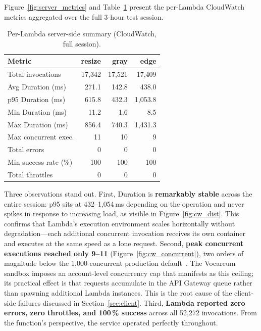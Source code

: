 \documentclass[10pt,twocolumn]{article}
\begin{document}
Figure~\ref{fig:server_metrics} and Table~\ref{tab:cloudwatch} present the
per-Lambda CloudWatch metrics aggregated over the full 3-hour test session.

\begin{table}[t]
\centering
\caption{Per-Lambda server-side summary (CloudWatch, full session).}
\label{tab:cloudwatch}
\small
\setlength{\tabcolsep}{3.5pt}
\begin{tabular}{lrrr}
\toprule
\textbf{Metric} & \textbf{resize} & \textbf{gray} & \textbf{edge} \\
\midrule
Total invocations       & 17{,}342 & 17{,}521 & 17{,}409 \\
Avg Duration (ms)       & 271.1    & 142.8    & 438.0    \\
p95 Duration (ms)       & 615.8    & 432.3    & 1{,}053.8 \\
Min Duration (ms)       & 11.2     & 1.6      & 8.5      \\
Max Duration (ms)       & 856.4    & 740.3    & 1{,}431.3 \\
Max concurrent exec.    & 11       & 10       & 9        \\
Total errors            & 0        & 0        & 0        \\
Min success rate (\%)   & 100      & 100      & 100      \\
Total throttles         & 0        & 0        & 0        \\
\bottomrule
\end{tabular}
\end{table}

Three observations stand out. First, Duration is \textbf{remarkably stable}
across the entire session: p95 sits at 432--1{,}054\,ms depending on the
operation and never spikes in response to increasing load, as visible in
Figure~\ref{fig:cw_dist}. This confirms that Lambda's execution environment
scales horizontally without degradation---each additional concurrent invocation
receives its own container and executes at the same speed as a lone request.
Second, \textbf{peak concurrent executions reached only 9--11}
(Figure~\ref{fig:cw_concurrent}), two orders of magnitude below the
1{,}000-concurrent production default~\cite{aws:concurrency}. The Vocareum
sandbox imposes an account-level concurrency cap that manifests as this ceiling;
its practical effect is that requests accumulate in the API Gateway queue rather
than spawning additional Lambda instances. This is the root cause of the
client-side failures discussed in Section~\ref{sec:client}. Third, \textbf{Lambda reported
zero errors, zero throttles, and 100\,\% success} across all 52{,}272
invocations. From the function's perspective, the service operated perfectly
throughout.
\end{document}
